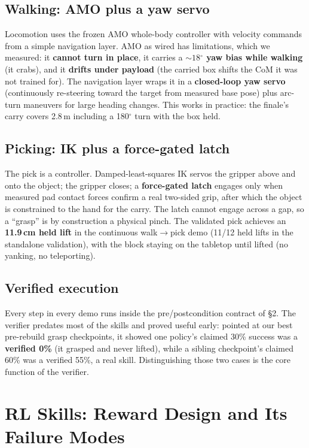 \documentclass[11pt]{article}
\newcommand{\degs}{$^{\circ}$}
\begin{document}
\subsection{Walking: AMO plus a yaw servo}

Locomotion uses the frozen AMO whole-body controller with velocity commands from a simple navigation layer. AMO as wired has limitations, which we measured: it \textbf{cannot turn in place}, it carries a \textbf{${\sim}18$\degs{} yaw bias while walking} (it crabs), and it \textbf{drifts under payload} (the carried box shifts the CoM it was not trained for). The navigation layer wraps it in a \textbf{closed-loop yaw servo} (continuously re-steering toward the target from measured base pose) plus arc-turn maneuvers for large heading changes. This works in practice: the finale's carry covers 2.8\,m including a 180\degs{} turn with the box held.

\subsection{Picking: IK plus a force-gated latch}
\label{sec:pick}

The pick is a controller. Damped-least-squares IK servos the gripper above and onto the object; the gripper closes; a \textbf{force-gated latch} engages only when measured pad contact forces confirm a real two-sided grip, after which the object is constrained to the hand for the carry. The latch cannot engage across a gap, so a ``grasp'' is by construction a physical pinch. The validated pick achieves an \textbf{11.9\,cm held lift} in the continuous walk$\to$pick demo (11/12 held lifts in the standalone validation), with the block staying on the tabletop until lifted (no yanking, no teleporting).

\subsection{Verified execution}

Every step in every demo runs inside the pre/postcondition contract of \S2. The verifier predates most of the skills and proved useful early: pointed at our best pre-rebuild grasp checkpoints, it showed one policy's claimed 30\% success was a \textbf{verified 0\%} (it grasped and never lifted), while a sibling checkpoint's claimed 60\% was a verified 55\%, a real skill. Distinguishing those two cases is the core function of the verifier.

\section{RL Skills: Reward Design and Its Failure Modes}
\end{document}
